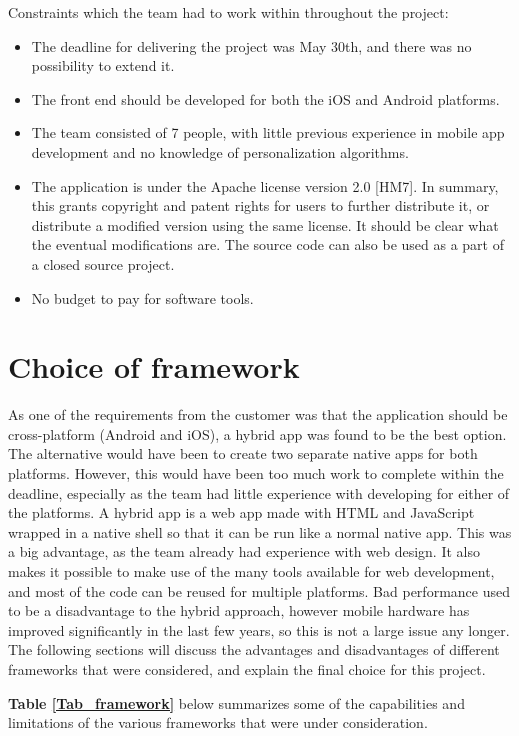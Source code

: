 Constraints which the team had to work within throughout the project:
\begin{itemize}
\item The deadline for delivering the project was May 30th, and there was no possibility to extend it.
\item The front end should be developed for both the iOS and Android platforms.
\item The team consisted of 7 people, with little previous experience in mobile app development and no knowledge of personalization algorithms.
\item The application is under the Apache license version 2.0 [HM7]. In summary, this grants copyright and patent rights for users to further distribute it, or distribute a modified version using the same license. It should be clear what the eventual modifications are. The source code can also be used as a part of a closed source project.
\item No budget to pay for software tools.
\end{itemize}

\section{Choice of framework}

As one of the requirements from the customer was that the application should be cross-platform (Android and iOS), a hybrid app was found to be the best option. The alternative would have been to create two separate native apps for both platforms. However, this would have been too much work to complete within the deadline, especially as the team had little experience with developing for either of the platforms. A hybrid app is a web app made with HTML and JavaScript wrapped in a native shell so that it can be run like a normal native app. This was a big advantage, as the team already had experience with web design. It also makes it possible to make use of the many tools available for web development, and most of the code can be reused for multiple platforms. Bad performance used to be a disadvantage to the hybrid approach, however mobile hardware has improved significantly in the last few years, so this is not a large issue any longer. The following sections will discuss the advantages and disadvantages of different frameworks that were considered, and explain the final choice for this project. \newline

\textbf{Table \ref{Tab_framework}} below summarizes some of the capabilities and limitations of the various frameworks that were under consideration.

